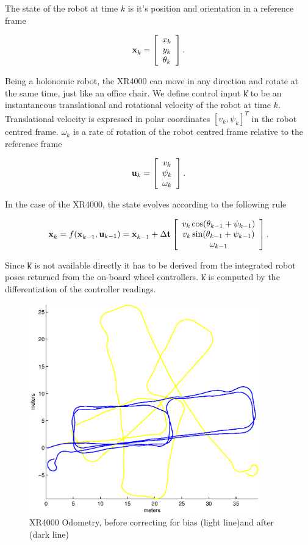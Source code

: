 The state of the robot at time $k$ is it's position and orientation in a
reference frame

$$
\x{k}{}{} = \left[\begin{array}{c} 
    x_k \\ 
    y_k \\ 
    \theta_k
  \end{array}\right].
$$

Being a holonomic robot, the XR4000 can move in any direction and rotate
at the same time, just like an office chair. We define control input
\U{k} to be an instantaneous translational and rotational velocity of
the robot at time $k$. Translational velocity is expressed in polar
coordinates $[v_k,\psi_k]^T$ in the robot centred frame. $\omega_k$ is
a rate of rotation of the robot centred frame relative to the
reference frame

$$
{\bf u}_{k} = \left[\begin{array}{c} v_k\\ \psi_k \\ \omega_k \end{array} \right].
$$

In the case of the XR4000, the state evolves according to the following
rule

$$
\x{k}{}{} = f(\x{k-1}{}{} ,\U{k-1}) = \x{k-1}{}{} + \Delta {\bf t}
\Vector{v_k\cos(\theta_{k-1} + \psi_{k-1})\\
v_k\sin(\theta_{k-1} + \psi_{k-1})\\
\omega_{k-1}}.
$$

Since \U{k} is not available directly it has to be derived from the
integrated robot poses returned from the on-board wheel controllers.
\U{k} is computed by the differentiation of the controller readings.

\begin{figure}[htbp]
  \centering

  \includegraphics[width=10cm]{Pics/xr4000_raw_odo}
  
  \caption[XR4000 odometry bias]
     {XR4000 Odometry, before correcting for bias (light line)and after (dark line)}
  \label{fig:xr4000_raw_odo}
\end{figure}

